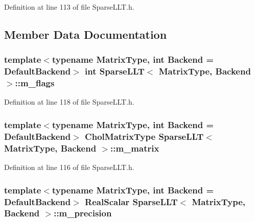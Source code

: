 Definition at line 113 of file Sparse\-L\-L\-T.\-h.



\subsection{Member Data Documentation}
\hypertarget{class_sparse_l_l_t_acf64c900cda7f6027ba04d05c317efa1}{
\subsubsection[{m\-\_\-flags}]{\setlength{\rightskip}{0pt plus 5cm}template$<$typename Matrix\-Type, int Backend = Default\-Backend$>$ {\bf int} {\bf Sparse\-L\-L\-T}$<$ Matrix\-Type, Backend $>$\-::m\-\_\-flags\hspace{0.3cm}{\ttfamily [protected]}}}\label{class_sparse_l_l_t_acf64c900cda7f6027ba04d05c317efa1}


Definition at line 118 of file Sparse\-L\-L\-T.\-h.

\hypertarget{class_sparse_l_l_t_a243638a7dbb93ce372b011c22f6a7570}{
\subsubsection[{m\-\_\-matrix}]{\setlength{\rightskip}{0pt plus 5cm}template$<$typename Matrix\-Type, int Backend = Default\-Backend$>$ {\bf Chol\-Matrix\-Type} {\bf Sparse\-L\-L\-T}$<$ Matrix\-Type, Backend $>$\-::m\-\_\-matrix\hspace{0.3cm}{\ttfamily [protected]}}}\label{class_sparse_l_l_t_a243638a7dbb93ce372b011c22f6a7570}


Definition at line 116 of file Sparse\-L\-L\-T.\-h.

\hypertarget{class_sparse_l_l_t_a13fc8ddc2821d9c67fb9f6c43311d516}{
\subsubsection[{m\-\_\-precision}]{\setlength{\rightskip}{0pt plus 5cm}template$<$typename Matrix\-Type, int Backend = Default\-Backend$>$ {\bf Real\-Scalar} {\bf Sparse\-L\-L\-T}$<$ Matrix\-Type, Backend $>$\-::m\-\_\-precision\hspace{0.3cm}{\ttfamily [protected]}}}\label{class_sparse_l_l_t_a13fc8ddc2821d9c67fb9f6c43311d516}


